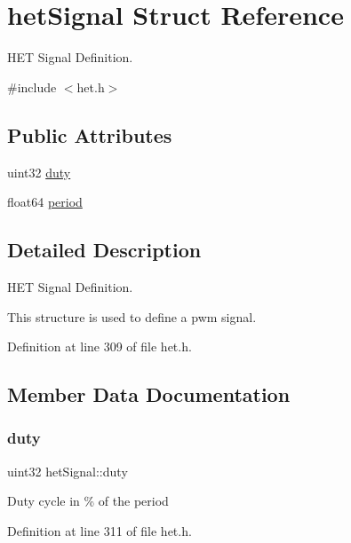 \hypertarget{structhetSignal}{}\section{het\+Signal Struct Reference}
\label{structhetSignal}


H\+ET Signal Definition.  




{\ttfamily \#include $<$het.\+h$>$}

\subsection*{Public Attributes}
\begin{DoxyCompactItemize}
\item 
uint32 \mbox{\hyperlink{structhetSignal_a72c07718e3c23772e8ebca52fcaccb87}{duty}}
\item 
float64 \mbox{\hyperlink{structhetSignal_aa0c332267f04abcb2bc4fe140083b109}{period}}
\end{DoxyCompactItemize}


\subsection{Detailed Description}
H\+ET Signal Definition. 

This structure is used to define a pwm signal. 

Definition at line 309 of file het.\+h.



\subsection{Member Data Documentation}
\mbox{\label{structhetSignal_a72c07718e3c23772e8ebca52fcaccb87}} 
\subsubsection{\texorpdfstring{duty}{duty}}
{\footnotesize\ttfamily uint32 het\+Signal\+::duty}

Duty cycle in \% of the period 

Definition at line 311 of file het.\+h.

\mbox{\label{structhetSignal_aa0c332267f04abcb2bc4fe140083b109}} 
